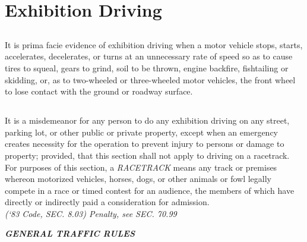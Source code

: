 \section{Exhibition Driving}
\subsection{}
It is prima facie evidence of exhibition driving when a motor vehicle stops, starts, accelerates, decelerates, or turns at an unnecessary rate of speed so as to cause tires to squeal, gears to grind, soil to be thrown, engine backfire, fishtailing or skidding, or, as to two-wheeled or three-wheeled motor vehicles, the front wheel to lose contact with the ground or roadway surface.
\subsection{}
It is a misdemeanor for any person to do any exhibition driving on any street, parking lot, or other public or private property, except when an emergency creates necessity for the operation to prevent injury to persons or damage to property; provided, that this section shall not apply to driving on a racetrack.  For purposes of this section, a \emph{RACETRACK} means any track or premises whereon motorized vehicles, horses, dogs, or other animals or fowl legally compete in a race or timed contest for an audience, the members of which have directly or indirectly paid a consideration for admission.\\
\emph{(‘83 Code, SEC. 8.03) Penalty, see SEC. 70.99}\\

\begin{center}
\emph{\textbf{\LARGE{GENERAL TRAFFIC RULES}}}
\end{center}
\setcounter{section}{14}
